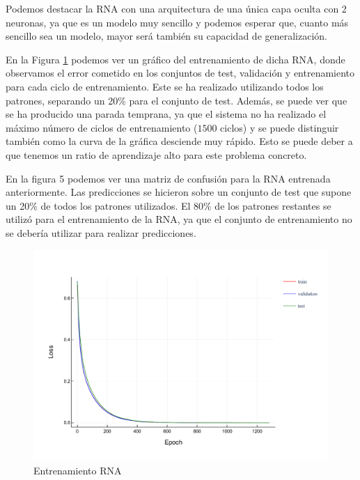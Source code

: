 \documentclass[12pt]{article}
\begin{document}
Podemos destacar la RNA con una arquitectura de una única capa oculta con 2 neuronas, ya que es un modelo muy sencillo y podemos esperar que, cuanto
más sencillo sea un modelo, mayor será también su capacidad de generalización. 

\bigskip
En la Figura \ref{fig:rna_train} podemos ver un gráfico del entrenamiento de dicha RNA, donde observamos el error
cometido en los conjuntos de test, validación y entrenamiento para cada ciclo de entrenamiento. Este se ha realizado
utilizando todos los patrones, separando un 20\% para el conjunto de test.
Además, se puede ver que se ha producido una parada temprana, ya que el sistema no ha realizado
el máximo número de ciclos de entrenamiento ($1500$ ciclos) y se puede distinguir también como la curva de la gráfica desciende muy rápido. 
Esto se puede deber a que tenemos un ratio de aprendizaje alto para este problema concreto.

\bigskip
En la figura 5 podemos ver una matriz de confusión para la RNA entrenada anteriormente. Las predicciones se hicieron sobre un conjunto
de test que supone un 20\% de todos los patrones utilizados. El 80\% de los patrones restantes se utilizó para el entrenamiento de la RNA,
ya que el conjunto de entrenamiento no se debería utilizar para realizar predicciones.

\begin{figure}[h!]
	\centering
	\includegraphics[width=1.0\linewidth]{best_rna_train.pdf}
	\caption{Entrenamiento RNA }
	\label{fig:rna_train}
\end{figure}
\end{document}
